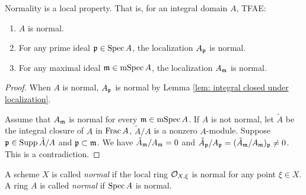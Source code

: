     \begin{proposition}\label{prop: normality is a local property}
        Normality is a local property. 
        That is, for an integral domain $A$, TFAE:
        \begin{enumerate}[label=(\roman*)]
            \item $A$ is normal.
            \item For any prime ideal ${\mathfrak{p}} \in \operatorname{Spec} A$, the localization $A_{\mathfrak{p}}$ is normal.
            \item For any maximal ideal ${\mathfrak{m}} \in \operatorname{mSpec} A$, the localization $A_{\mathfrak{m}}$ is normal.
        \end{enumerate}
    \end{proposition}
    \begin{proof}
        When $A$ is normal, $A_{\mathfrak{p}}$ is normal by Lemma \ref{lem: integral closed under localization}.

        Assume that $A_{\mathfrak{m}}$ is normal for every ${\mathfrak{m}} \in \operatorname{mSpec} A$.
        If $A$ is not normal, let $\tilde{A}$ be the integral closure of $A$ in $\operatorname{Frac} A$, $\tilde{A}/A$ is a nonzero $A$-module.
        Suppose ${\mathfrak{p}} \in \operatorname{Supp} \tilde{A}/A$ and ${\mathfrak{p}} \subset {\mathfrak{m}}$.
        We have $\tilde{A}_{\mathfrak{m}}/A_{\mathfrak{m}} = 0$ and $\tilde{A}_{\mathfrak{p}}/A_{\mathfrak{p}} = (\tilde{A}_{\mathfrak{m}}/A_{\mathfrak{m}})_{\mathfrak{p}} \neq 0$.
        This is a contradiction.
    \end{proof}


    \begin{definition}\label{def: normal of scheme and general ring}
        A scheme $X$ is called \textit{normal} if the local ring ${\mathcal{O}}_{X,\xi}$ is normal for any point $\xi \in X$.
        A ring $A$ is called \textit{normal} if $\operatorname{Spec} A$ is normal.
    \end{definition}

